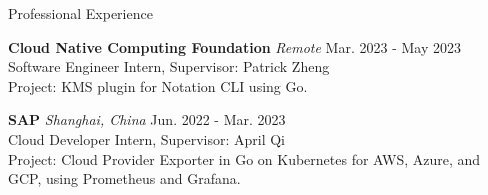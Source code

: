 
\begin{rSection}{Professional Experience}

    
    \small{{\bf Cloud Native Computing Foundation} \textit{Remote} \hfill Mar. 2023 - May 2023
\\ Software Engineer Intern, Supervisor: Patrick Zheng
\\
Project: KMS plugin for Notation CLI using Go. 


\vspace{-1mm}
{\bf SAP} \textit{Shanghai, China} \hfill Jun. 2022 - Mar. 2023
\\ Cloud Developer Intern, Supervisor: April Qi
\\
Project: Cloud Provider Exporter in Go on Kubernetes for AWS, Azure, and GCP, using Prometheus and Grafana.
}
\vspace{-1mm}


    
    \vspace{-1mm}
    
    \end{rSection}
    
    